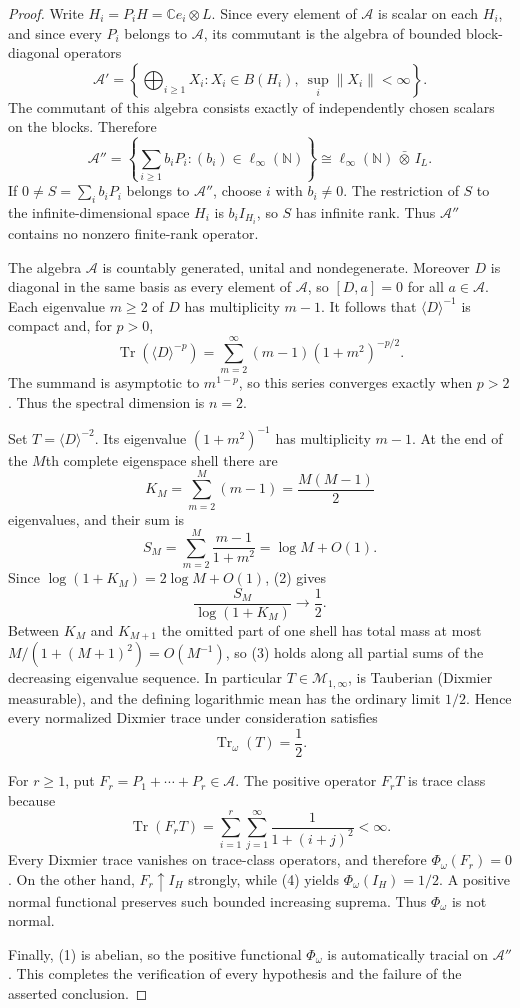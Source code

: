 \documentclass[11pt]{article}
\newcommand{\A}{\mathcal A}
\newcommand{\M}{\mathcal M}
\newcommand{\Tr}{\operatorname{Tr}}
\newcommand{\N}{\mathbb N}
\begin{document}
\begin{proof}
Write $H_i=P_iH=\mathbb Ce_i\otimes L$.  Since every element of $\A$ is
scalar on each $H_i$, and since every $P_i$ belongs to $\A$, its commutant is
the algebra of bounded block-diagonal operators
\[
 \A'=\left\{\bigoplus_{i\geq1}X_i:X_i\in B(H_i),\
                         \sup_i\|X_i\|<\infty\right\}.
\]
The commutant of this algebra consists exactly of independently chosen
scalars on the blocks.  Therefore
\[
 \A''=\left\{\sum_{i\geq1}b_iP_i:(b_i)\in\ell_\infty(\N)\right\}
       \cong \ell_\infty(\N)\,\bar\otimes\,I_L.                 \tag{1}
\]
If $0\neq S=\sum_i b_iP_i$ belongs to $\A''$, choose $i$ with $b_i\neq0$.
The restriction of $S$ to the infinite-dimensional space $H_i$ is
$b_iI_{H_i}$, so $S$ has infinite rank.  Thus $\A''$ contains no nonzero
finite-rank operator.

The algebra $\A$ is countably generated, unital and nondegenerate.  Moreover
$D$ is diagonal in the same basis as every element of $\A$, so $[D,a]=0$ for
all $a\in\A$.  Each eigenvalue $m\geq2$ of $D$ has multiplicity $m-1$.
It follows that $\langle D\rangle^{-1}$ is compact and, for $p>0$,
\[
 \Tr(\langle D\rangle^{-p})
 =\sum_{m=2}^{\infty}(m-1)(1+m^2)^{-p/2}.
\]
The summand is asymptotic to $m^{1-p}$, so this series converges exactly when
$p>2$.  Thus the spectral dimension is $n=2$.

Set $T=\langle D\rangle^{-2}$.  Its eigenvalue
$(1+m^2)^{-1}$ has multiplicity $m-1$.  At the end of the $M$th complete
eigenspace shell there are
\[
 K_M=\sum_{m=2}^M(m-1)=\frac{M(M-1)}2
\]
eigenvalues, and their sum is
\[
 S_M=\sum_{m=2}^M\frac{m-1}{1+m^2}=\log M+O(1).                \tag{2}
\]
Since $\log(1+K_M)=2\log M+O(1)$, (2) gives
\[
 \frac{S_M}{\log(1+K_M)}\longrightarrow\frac12.              \tag{3}
\]
Between $K_M$ and $K_{M+1}$ the omitted part of one shell has total mass at
most $M/(1+(M+1)^2)=O(M^{-1})$, so (3) holds along all partial sums of the
decreasing eigenvalue sequence.  In particular $T\in\M_{1,\infty}$, is
Tauberian (Dixmier measurable), and the defining logarithmic mean has the
ordinary limit $1/2$.  Hence every normalized Dixmier trace under
consideration satisfies
\[
 \Tr_\omega(T)=\frac12.                                      \tag{4}
\]

For $r\geq1$, put $F_r=P_1+\cdots+P_r\in\A$.  The positive operator $F_rT$
is trace class because
\[
 \Tr(F_rT)=\sum_{i=1}^r\sum_{j=1}^{\infty}
                 \frac1{1+(i+j)^2}<\infty.                   \tag{5}
\]
Every Dixmier trace vanishes on trace-class operators, and therefore
$\Phi_\omega(F_r)=0$.  On the other hand, $F_r\uparrow I_H$ strongly, while
(4) yields $\Phi_\omega(I_H)=1/2$.  A positive normal functional preserves
such bounded increasing suprema.  Thus $\Phi_\omega$ is not normal.

Finally, (1) is abelian, so the positive functional $\Phi_\omega$ is
automatically tracial on $\A''$.  This completes the verification of every
hypothesis and the failure of the asserted conclusion.
\end{proof}
\end{document}
